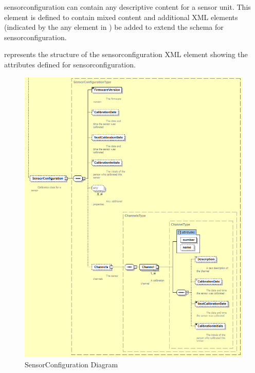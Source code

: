 \documentclass{mtconnect}	%
\begin{document}
\gls{sensorconfiguration} can contain any descriptive content for a \gls{sensor unit}.  This element is defined to contain mixed content and additional XML elements (indicated by the \gls{any} element in ) \may be added to extend the schema for \gls{sensorconfiguration}.

 represents the structure of the \gls{sensorconfiguration} XML element showing the attributes defined for \gls{sensorconfiguration}. 

\begin{figure}[ht]
  \centering
  \includegraphics[width=.75\textwidth]{figures/sensorconfiguration-schema-diagram.png}
  \caption{SensorConfiguration Diagram}
  \label{fig:sensorconfiguration-schema-diagram}
\end{figure}
\FloatBarrier
\end{document}
